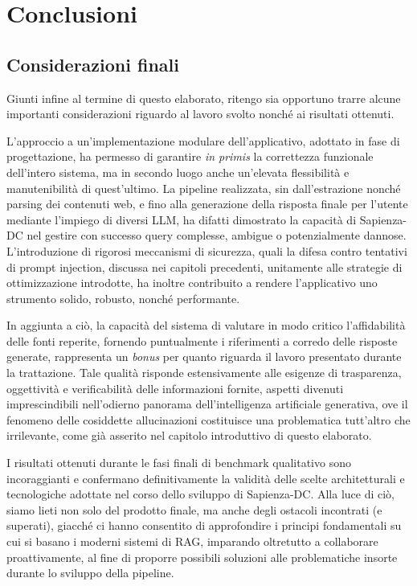 \chapter{Conclusioni}
\section{Considerazioni finali}
Giunti infine al termine di questo elaborato, ritengo sia opportuno trarre alcune importanti considerazioni riguardo al lavoro svolto nonché ai risultati ottenuti.

L'approccio a un'implementazione modulare dell'applicativo, adottato in fase di progettazione, ha permesso di garantire \textit{in primis} la correttezza funzionale dell'intero sistema, ma in secondo luogo anche un'elevata flessibilità e manutenibilità di quest'ultimo. La pipeline realizzata, sin dall'estrazione nonché parsing dei contenuti web, e fino alla generazione della risposta finale per l'utente mediante l'impiego di diversi LLM, ha difatti dimostrato la capacità di Sapienza-DC nel gestire con successo query complesse, ambigue o potenzialmente dannose. L'introduzione di rigorosi meccanismi di sicurezza, quali la difesa contro tentativi di prompt injection, discussa nei capitoli precedenti, unitamente alle strategie di ottimizzazione introdotte, ha inoltre contribuito a rendere l'applicativo uno strumento solido, robusto, nonché performante.

In aggiunta a ciò, la capacità del sistema di valutare in modo critico l'affidabilità delle fonti reperite, fornendo puntualmente i riferimenti a corredo delle risposte generate, rappresenta un \textit{bonus} per quanto riguarda il lavoro presentato durante la trattazione. Tale qualità risponde estensivamente alle esigenze di trasparenza, oggettività e verificabilità delle informazioni fornite, aspetti divenuti imprescindibili nell'odierno panorama dell'intelligenza artificiale generativa, ove il fenomeno delle cosiddette allucinazioni costituisce una problematica tutt'altro che irrilevante, come già asserito nel capitolo introduttivo di questo elaborato.

I risultati ottenuti durante le fasi finali di benchmark qualitativo sono incoraggianti e confermano definitivamente la validità delle scelte architetturali e tecnologiche adottate nel corso dello sviluppo di Sapienza-DC. Alla luce di ciò, siamo lieti non solo del prodotto finale, ma anche degli ostacoli incontrati (e superati), giacché ci hanno consentito di approfondire i principi fondamentali su cui si basano i moderni sistemi di RAG, imparando oltretutto a collaborare proattivamente, al fine di proporre possibili soluzioni alle problematiche insorte durante lo sviluppo della pipeline.     

